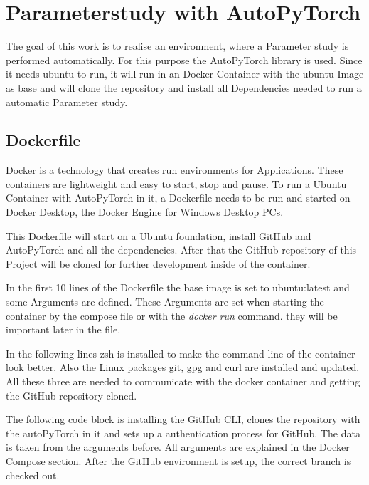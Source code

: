 \documentclass[a4paper, 12pt, oneside]{scrbook}
\begin{document}
		\section{Parameterstudy with AutoPyTorch}
		
		\noindent The goal of this work is to realise an environment, where a Parameter study is performed automatically. For this purpose the AutoPyTorch library is used. Since it needs ubuntu to run, it will run in an Docker Container with the ubuntu Image as base and will clone the repository and install all Dependencies needed to run a automatic Parameter study.
		
		\subsection{Dockerfile}
		
		\noindent Docker is a technology that creates run environments for Applications. These containers are lightweight and easy to start, stop and pause. To run a Ubuntu Container with AutoPyTorch in it, a Dockerfile needs to be run and started on Docker Desktop, the Docker Engine for Windows Desktop PCs.
		
		\noindent This Dockerfile will start on a Ubuntu foundation, install GitHub and AutoPyTorch and all the dependencies. After that the GitHub repository of this Project will be cloned for further development inside of the container. 
		
		\noindent In the first 10 lines of the Dockerfile the base image is set to ubuntu:latest and some Arguments are defined. These Arguments are set when starting the container by the compose file or with the \textit{docker run} command. they will be important later in the file. 
		
		
		\noindent 
		
		\noindent In the following lines zsh is installed to make the command-line of the container look better. Also the Linux packages git, gpg and curl are installed and updated. All these three are needed to communicate with the docker container and getting the GitHub repository cloned.
		
		\noindent 
		
		\noindent The following code block is installing the GitHub CLI, clones the repository with the autoPyTorch in it and sets up a authentication process for GitHub. The data is taken from the arguments before. All arguments are explained in the Docker Compose section. After the GitHub environment is setup, the correct branch is checked out. 
		
\end{document}
